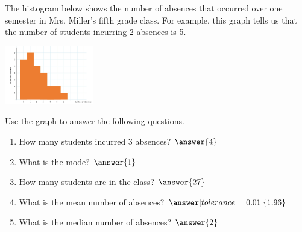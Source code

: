 \documentclass{ximera}
\begin{document}
\begin{problem}\label{prob:140hom2prob3}
The histogram below shows the number of absences that occurred over one semester in Mrs. Miller's fifth grade class.  For example, this graph tells us that the number of students incurring 2 absences is 5.

\begin{image}
   \includegraphics[height=1in]{140H2pic6.jpg}
 \end{image}
 
 Use the graph to answer the following questions.
 
 \begin{enumerate}
     \item How many students incurred 3 absences? $\answer{4}$
     \item What is the mode? $\answer{1}$
     \item How many students are in the class? $\answer{27}$
     \item What is the mean number of absences? $\answer[tolerance=0.01]{1.96}$
     \item What is the median number of absences? $\answer{2}$
 \end{enumerate}
\end{problem}
\end{document}
